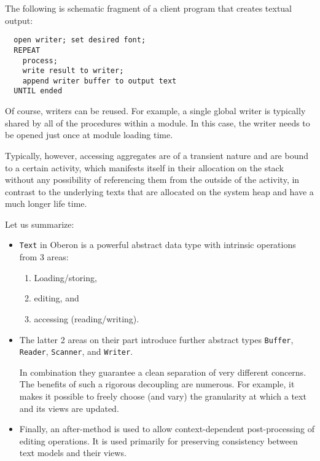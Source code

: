 The following is schematic fragment of a client program that creates textual output:
\begin{verbatim}
  open writer; set desired font;
  REPEAT
    process;
    write result to writer;
    append writer buffer to output text
  UNTIL ended
\end{verbatim}
Of course, writers can be reused.
For example, a single global writer is typically shared by all of the procedures within a module.
In this case, the writer needs to be opened just once at module loading time.

Typically, however, accessing aggregates are of a transient nature and are bound to a certain activity,
which manifests itself in their allocation on the stack
without any possibility of referencing them from the outside of the activity,
in contrast to the underlying texts that are allocated on the system heap and have a much longer life time.

Let us summarize:
\begin{itemize}
  \item \verb|Text| in Oberon is a powerful abstract data type with intrinsic operations from 3 areas:
    \begin{enumerate}
      \item Loading/storing,
      \item editing, and
      \item accessing (reading/writing).
    \end{enumerate}
  \item The latter 2 areas on their part introduce further abstract types
    \verb|Buffer|, \verb|Reader|, \verb|Scanner|, and \verb|Writer|.

    In combination they guarantee a clean separation of very different concerns.
    The benefits of such a rigorous decoupling are numerous.
    For example, it makes it possible to freely choose (and vary) the granularity
    at which a text and its views are updated.
  \item Finally, an after-method is used to allow context-dependent post-processing of editing operations.
    It is used primarily for preserving consistency between text models and their views.
\end{itemize}
